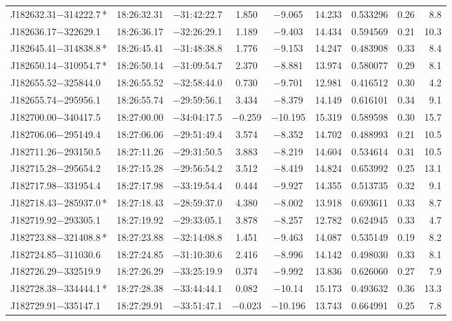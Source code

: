 \begin{table*}
\begin{tabular}{lcccccccr}
J182632.31$-$314222.7\,* & 18:26:32.31 & $-$31:42:22.7 &  1.850 & $-$9.065 & 14.233 & 0.533296 & 0.26 & 8.8 \\
J182636.17$-$322629.1 & 18:26:36.17 & $-$32:26:29.1 &  1.189 & $-$9.403 & 14.434 & 0.594569 & 0.21 & 10.3 \\
J182645.41$-$314838.8\,* & 18:26:45.41 & $-$31:48:38.8 &  1.776 & $-$9.153 & 14.247 & 0.483908 & 0.33 & 8.4 \\
J182650.14$-$310954.7\,* & 18:26:50.14 & $-$31:09:54.7 &  2.370 & $-$8.881 & 13.974 & 0.580077 & 0.29 & 8.1 \\
J182655.52$-$325844.0 & 18:26:55.52 & $-$32:58:44.0 &  0.730 & $-$9.701 & 12.981 & 0.416512 & 0.30 & 4.2 \\
J182655.74$-$295956.1 & 18:26:55.74 & $-$29:59:56.1 &  3.434 & $-$8.379 & 14.149 & 0.616101 & 0.34 & 9.1 \\
J182700.00$-$340417.5 & 18:27:00.00 & $-$34:04:17.5 & $-$0.259 & $-$10.195 & 15.319 & 0.589598 & 0.30 & 15.7 \\
J182706.06$-$295149.4 & 18:27:06.06 & $-$29:51:49.4 &  3.574 & $-$8.352 & 14.702 & 0.488993 & 0.21 & 10.5 \\
J182711.26$-$293150.5 & 18:27:11.26 & $-$29:31:50.5 &  3.883 & $-$8.219 & 14.604 & 0.534614 & 0.31 & 10.5 \\
J182715.28$-$295654.2 & 18:27:15.28 & $-$29:56:54.2 &  3.512 & $-$8.419 & 14.824 & 0.653992 & 0.25 & 13.1 \\
J182717.98$-$331954.4 & 18:27:17.98 & $-$33:19:54.4 &  0.444 & $-$9.927 & 14.355 & 0.513735 & 0.32 & 9.1 \\
J182718.43$-$285937.0\,* & 18:27:18.43 & $-$28:59:37.0 &  4.380 & $-$8.002 & 13.918 & 0.693611 & 0.33 & 8.7 \\
J182719.92$-$293305.1 & 18:27:19.92 & $-$29:33:05.1 &  3.878 & $-$8.257 & 12.782 & 0.624945 & 0.33 & 4.7 \\
J182723.88$-$321408.8\,* & 18:27:23.88 & $-$32:14:08.8 &  1.451 & $-$9.463 & 14.087 & 0.535149 & 0.19 & 8.2 \\
J182724.85$-$311030.6 & 18:27:24.85 & $-$31:10:30.6 &  2.416 & $-$8.996 & 14.142 & 0.498030 & 0.33 & 8.1 \\
J182726.29$-$332519.9 & 18:27:26.29 & $-$33:25:19.9 &  0.374 & $-$9.992 & 13.836 & 0.626060 & 0.27 & 7.9 \\
J182728.38$-$334444.1\,* & 18:27:28.38 & $-$33:44:44.1 &  0.082 & $-$10.14 & 15.173 & 0.493632 & 0.36 & 13.3 \\
J182729.91$-$335147.1 & 18:27:29.91 & $-$33:51:47.1 & $-$0.023 & $-$10.196 & 13.743 & 0.664991 & 0.25 & 7.8 \\

\end{tabular}
\end{table*}
